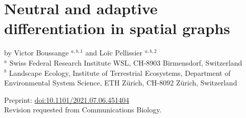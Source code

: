 %
\graphicspath{{./content/diff_in_graphs/assets/}}

\chapter{Neutral and adaptive differentiation in spatial graphs}
\label{sec:diff-in-graphs}

by Victor Boussange $^{a,b,1}$ and Loïc Pellissier $^{a,b,2}$\bigskip\\

$^a$ \small{Swiss Federal Research Institute WSL, CH-8903 Birmensdorf, Switzerland}\smallskip\\
$^b$ \small{Landscape Ecology, Institute of Terrestrial Ecosystems, Department of Environmental System Science, ETH Zürich, CH-8092 Zürich, Switzerland}\smallskip\\

\begin{center}
  Preprint: \href{https://doi.org/10.1101/2021.07.06.451404}{doi:10.1101/2021.07.06.451404}\\
  Revision requested from Communications Biology.
\end{center}

